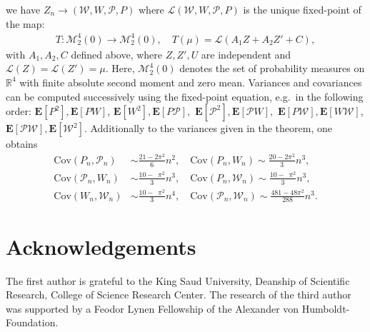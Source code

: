 \documentclass{amsart}       %
\newcommand{\Ew}{\ensuremath{\mathcal P}}
\newcommand{\Ww}{\ensuremath{\mathcal W}}
\newcommand{\R}{\ensuremath{\mathbb{R}}}
\newcommand{\E}[1]{\ensuremath{\mathbf{E} \left[#1 \right]}}
\begin{document}
we have $Z_n \to (\Ww,W,\Ew,P)$
where $\mathcal{L}(\Ww,W,\Ew,P)$ is the unique
fixed-point of the map:
\begin{align}
T : \mathcal{M}_2^4(0) \longrightarrow\mathcal{M}_2^4(0), \quad T(\mu) = \mathcal{L} \left(A_1 Z +A_2 Z' + C \right), \label{fixT}
\end{align}
with $A_1, A_2, C$ defined above,
 where $Z, Z', U$ are independent and
 $\mathcal{L}(Z)=\mathcal{L}(Z')=\mu$. Here, $\mathcal{M}_2^4(0)$ denotes the set of probability measures on $\R^4$ with finite absolute second moment and zero mean. Variances and covariances can be computed successively using the fixed-point equation, e.g.\ in the following order:
 $\E{P^2}, \E{P W}$, $\E{W^2}, \E{P \Ew},$ $\E{\Ew^2}, \E{\Ew W},$  $\E{P \Ww}, \E{W \Ww}$, $\E{\Ew \Ww}, \E{\Ww^2}$. Additionally to the variances given in the theorem, one obtains
 \begin{align}
 \text{Cov}(P_n, \Ew_n) & \sim \frac{21 - 2 \pi^2}{ 6} n^2, \quad \text{Cov}(P_n, W_n) \sim \frac{20 -2 \pi^2}{3} n^3, \label{covs}\\
 \text{Cov}(\Ew_n, W_n) & \sim   \frac{10 -  \phantom{2} \pi^2}{3} n^3, \quad \text{Cov}(P_n, \Ww_n) \sim  \frac{10 -  \phantom{2} \pi^2}{3} n^3, \\
 \text{Cov}(W_n, \Ww_n) & \sim  \frac{10 - \phantom{2}  \pi^2}{3} n^4, \quad  \text{Cov}(\Ew_n, \Ww_n)  \sim \frac{481 -48 \pi^2}{288} n^3. \label{cove}
 \end{align}





\section*{Acknowledgements}
The first author is  grateful to the King Saud University, Deanship
of Scientific Research, College of Science Research
Center. The research of the third author was supported by a Feodor Lynen Fellowship of the Alexander von Humboldt-Foundation.
\end{document}
